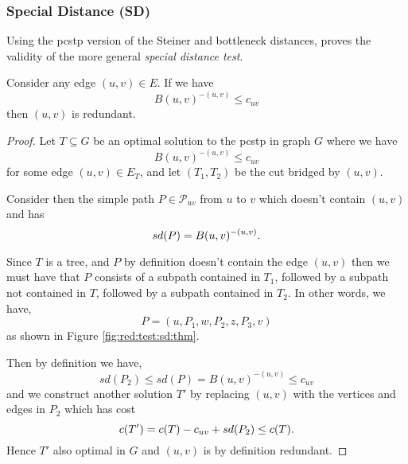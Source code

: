  \subsubsection{Special Distance (SD)}
 \label{sec:red:test:sd}
 Using the \gls{pcstp} version of the Steiner and bottleneck distances, \cite{uchoa2006reduction} proves
  the validity of the more general \textit{special distance test}.
 \begin{theorem}
 Consider any edge $(u,v) \in E$. If we have
 $$B(u,v)^{-(u,v)} \leq c_{uv}$$
 then $(u,v)$ is redundant.
\end{theorem}
 \begin{proof}
   Let $T  \subseteq G$ be an optimal solution to the \gls{pcstp} in graph $G$
   where we have
   $$B(u,v)^{-(u,v)} \leq c_{uv}$$
   for some edge $(u,v) \in E_T$, and let $(T_1, T_2)$ be the cut bridged
   by $(u,v)$.

   Consider then the simple path $P \in \mathcal{P}_{uv}$ from $u$ to $v$ which doesn't
    contain $(u,v)$ and has
   $$sd(P) = B(u,v)^{-(u,v)}\mathnormal{.}$$

   Since $T$ is a tree, and $P$ by definition doesn't contain the edge $(u,v)$
   then we must have that $P$ consists of a subpath contained in $T_1$, followed by
   a subpath not contained in $T$, followed by a subpath contained in $T_2$.
   In other words, we have,
   $$P = (u, P_1, w, P_2, z, P_3, v)$$
   as shown in Figure \ref{fig:red:test:sd:thm}.

   Then by definition we have,
   $$sd(P_2) \leq sd(P) = B(u,v)^{-(u,v)} \leq c_{uv}$$
   and we construct another solution $T'$ by replacing $(u,v)$ with the
   vertices and edges in $P_2$ which has cost
   $$c(T') = c(T) - c_{uv} + sd(P_2) \leq c(T)\mathnormal{.}$$
   Hence $T'$ also optimal in $G$ and $(u,v)$ is by definition redundant.
\end{proof}
